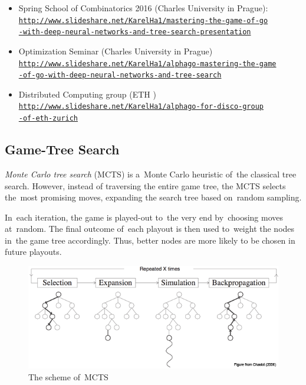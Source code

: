 \begin{itemize}
  \item Spring School of Combinatorics 2016 (Charles University in Prague): \\
    \href{http://www.slideshare.net/KarelHa1/mastering-the-game-of-go-with-deep-neural-networks-and-tree-search-presentation}
    {\tt http://www.slideshare.net/KarelHa1/mastering-the-game-of-go\\-with-deep-neural-networks-and-tree-search-presentation}

  \item Optimization Seminar (Charles University in Prague) \\
    \href{http://www.slideshare.net/KarelHa1/alphago-mastering-the-game-of-go-with-deep-neural-networks-and-tree-search}
    {\tt http://www.slideshare.net/KarelHa1/alphago-mastering-the-game\\-of-go-with-deep-neural-networks-and-tree-search}

  \item Distributed Computing group (ETH \Zurich) \\
    \href{http://www.slideshare.net/KarelHa1/alphago-for-disco-group-of-eth-zurich}
    {\tt http://www.slideshare.net/KarelHa1/alphago-for-disco-group\\-of-eth-zurich}
\end{itemize}

\subsection{Game-Tree Search}

\emph{Monte Carlo tree search} (MCTS) is a~Monte Carlo heuristic of~the classical tree search.
However, instead of traversing the entire game tree, the MCTS selects the~most promising moves, expanding the search tree based on~random sampling.

In~each iteration, the game is played-out to~the very end by~choosing moves at~random.
The final outcome of~each playout is then used to~weight the nodes in~the game tree accordingly.
Thus, better nodes are more likely to be chosen in future playouts.

\begin{figure}[H]
  \centering
  \includegraphics[width=.7\textwidth]{../img/MCTS.png}
  \caption{The scheme of~MCTS}
  \label{fig:MCTS}
\end{figure}

